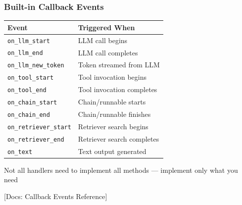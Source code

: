 \documentclass[aspectratio=169,11pt]{beamer}
\newcommand{\docref}[1]{{\scriptsize\color{docgray}[Docs: #1]}}
\begin{document}
\begin{frame}
  \frametitle{Built-in Callback Events}

  \begin{table}
    \small
    \centering
    \begin{tabular}{ll}
      \toprule
      \textbf{Event} & \textbf{Triggered When} \\
      \midrule
      \texttt{on\_llm\_start} & LLM call begins \\
      \texttt{on\_llm\_end} & LLM call completes \\
      \texttt{on\_llm\_new\_token} & Token streamed from LLM \\
      \texttt{on\_tool\_start} & Tool invocation begins \\
      \texttt{on\_tool\_end} & Tool invocation completes \\
      \texttt{on\_chain\_start} & Chain/runnable starts \\
      \texttt{on\_chain\_end} & Chain/runnable finishes \\
      \texttt{on\_retriever\_start} & Retriever search begins \\
      \texttt{on\_retriever\_end} & Retriever search completes \\
      \texttt{on\_text} & Text output generated \\
      \bottomrule
    \end{tabular}
  \end{table}

  \vspace{0.15cm}

  \begin{tipbox}
    Not all handlers need to implement all methods — implement only what you need
  \end{tipbox}

  \docref{Callback Events Reference}
\end{frame}

\end{document}
